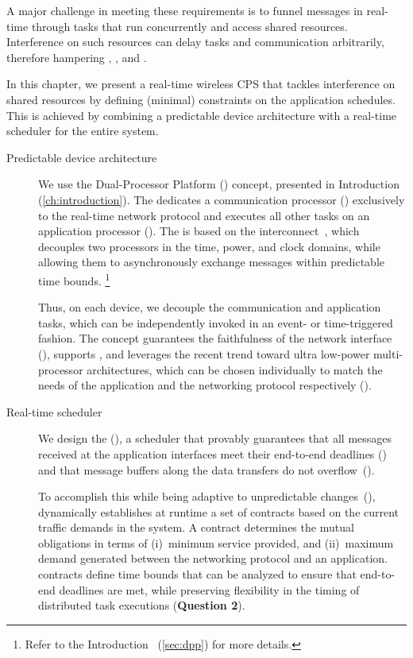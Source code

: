 A major challenge in meeting these requirements is to funnel messages in real-time through tasks that run concurrently and access shared resources.
Interference on such resources can delay tasks and communication arbitrarily, therefore hampering
, , and .

In this chapter, we present a real-time wireless CPS that tackles interference on shared resources by defining (minimal) constraints on the application schedules.
This is achieved by combining a predictable device architecture with a real-time scheduler for the entire system.
\begin{description}
  \item[Predictable device architecture]
  We use the Dual-Processor Platform (\DPP) concept, presented in Introduction (\cref{ch:introduction}). The \DPP dedicates a communication processor (\cp) exclusively to the real-time network protocol and executes all other tasks on an application processor (\ap).
  The \DPP is based on the \bolt interconnect~\cite{sutton2015Bolt}, which decouples two processors in the time, power, and clock domains, while allowing them to asynchronously exchange messages within predictable time bounds.%
  \footnote{Refer to the Introduction~ (\cref{sec:dpp}) for more details.}

  Thus, on each device, we decouple the communication and application tasks, which can be independently invoked in an event- or time-triggered fashion.
  The \DPP concept guarantees the faithfulness of the network interface (), supports , and leverages the recent trend toward ultra low-power multi-processor architectures, which can be chosen individually to match the needs of the application and the networking protocol respectively ().

  \item[Real-time scheduler]
  We design the \DRPLong (\DRP), a scheduler that provably guarantees that all messages received at the application interfaces meet their end-to-end deadlines () and that message buffers along the data transfers do not overflow~().

  To accomplish this while being adaptive to unpredictable changes~(), \DRP dynamically establishes at runtime a set of {contracts} based on the current traffic demands in the system. A contract determines the mutual obligations in terms of
    (i)~minimum service provided, and
    (ii)~maximum demand generated
  between the networking protocol and an application.
  \DRP contracts define time bounds that can be analyzed to ensure that end-to-end deadlines are met, while
  preserving flexibility in the timing of distributed task executions (\textbf{Question 2}).

\end{description}

